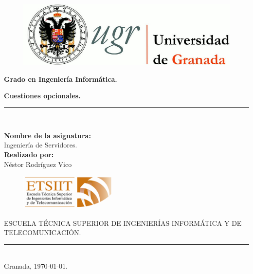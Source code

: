 \documentclass[a4paper,titlepage,12pt]{report}	%
\numberwithin{figure}{section} %
\numberwithin{table}{section} %
\begin{document}
	\lstset{inputencoding=utf8/latin1} %
	\begin{titlepage}
		\begin{center}
			\begin{figure}[htb]
				\begin{center}
					\includegraphics[width=12cm]{./Portada/ugr.png}
				\end{center}
			\end{figure}

			\vspace*{0.8cm}
			\begin{Large}
				\textbf{Grado en Ingeniería Informática.}\\
			\end{Large}
			\begin{Huge}
				\vspace{1.5cm}
				\textbf{Cuestiones opcionales.} \\
			\end{Huge}
			\vspace*{0.76cm}
			\rule{100mm}{0.1mm}\\
			\vspace*{0.5cm}
			\begin{large}
				\textbf{Nombre de la asignatura:}\\
				Ingeniería de Servidores.\\
				\vspace*{0.5cm}
				\textbf{Realizado por:}\\
				Néstor Rodríguez Vico \\

				\vspace*{2cm}
				\begin{figure}[htb]
					\begin{center}
						\includegraphics[width=5cm]{./Portada/etsiit.png}
					\end{center}
				\end{figure}
				\vspace*{-0.6cm}
				ESCUELA TÉCNICA SUPERIOR DE INGENIERÍAS INFORMÁTICA Y DE TELECOMUNICACIÓN.\\
				\rule{20mm}{0.1mm}\\
				\vspace*{0.6cm}
				Granada, \today.
			\end{large}
		\end{center}
	\end{titlepage}
\end{document}

